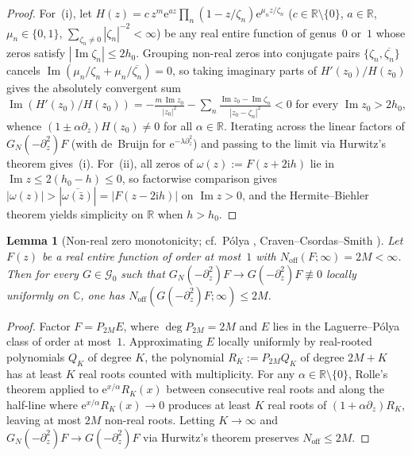 \documentclass[11pt,a4paper,reqno]{amsart}
\newtheorem{lemma}[theorem]{Lemma}
\theoremstyle{definition}
\theoremstyle{remark}
\numberwithin{equation}{section}
\newcommand{\R}{\mathbb{R}}
\newcommand{\C}{\mathbb{C}}
\newcommand{\ii}{\mathrm{i}}
\newcommand{\ee}{\mathrm{e}}
\DeclareMathOperator{\Imop}{Im}
\begin{document}
\begin{proof}
For~(i), let $H(z) = c\,z^m \ee^{a z}\prod_n (1 - z/\zeta_n)\ee^{\mu_n z/\zeta_n}$ ($c \in \R\setminus\{0\}$, $a \in \R$, $\mu_n \in \{0,1\}$, $\sum_{\zeta_n \ne 0} |\zeta_n|^{-2} < \infty$) be any real entire function of genus~$0$ or~$1$ whose zeros satisfy $|\Imop\zeta_n| \le 2h_0$. Grouping non-real zeros into conjugate pairs $\{\zeta_n, \overline{\zeta_n}\}$ cancels $\Imop(\mu_n/\zeta_n + \mu_n/\overline{\zeta_n}) = 0$, so taking imaginary parts of $H'(z_0)/H(z_0)$ gives the absolutely convergent sum $\Imop(H'(z_0)/H(z_0)) = -\frac{m\,\Imop z_0}{|z_0|^2} - \sum_n \frac{\Imop z_0 - \Imop\zeta_n}{|z_0 - \zeta_n|^2} < 0$ for every $\Imop z_0 > 2h_0$, whence $(1 \pm \alpha\partial_z)H(z_0) \ne 0$ for all $\alpha \in \R$. Iterating across the linear factors of $G_N(-\partial_z^2)F$ (with de~Bruijn \cite[Thm.~13]{debruijn1950} for $\ee^{-\lambda\partial_z^2}$) and passing to the limit via Hurwitz's theorem gives~(i). For~(ii), all zeros of $\omega(z) := F(z + 2\ii h)$ lie in $\Imop z \le 2(h_0 - h) \le 0$, so factorwise comparison gives $|\omega(z)| > |\overline{\omega(\bar{z})}| = |F(z - 2\ii h)|$ on $\Imop z > 0$, and the Hermite--Biehler theorem yields simplicity on $\R$ when $h > h_0$.
\end{proof}

\begin{lemma}[{Non-real zero monotonicity; cf.\ P\'olya \cite{polya1927}, Craven--Csordas--Smith \cite{cravencsordassmith1987}}]
\label{lem:nonreal-monotonicity}
Let $F(z)$ be a real entire function of order at most~$1$ with $N_{\mathrm{off}}(F; \infty) = 2M < \infty$. Then for every $G \in \mathcal{G}_0$ such that $G_N(-\partial_z^2)F \to G(-\partial_z^2)F \not\equiv 0$ locally uniformly on $\C$, one has $N_{\mathrm{off}}(G(-\partial_z^2)F; \infty) \le 2M$.
\end{lemma}

\begin{proof}
Factor $F = P_{2M}E$, where $\deg P_{2M} = 2M$ and $E$ lies in the Laguerre--P\'olya class of order at most~$1$. Approximating $E$ locally uniformly by real-rooted polynomials $Q_K$ of degree $K$, the polynomial $R_K := P_{2M}Q_K$ of degree $2M + K$ has at least $K$ real roots counted with multiplicity. For any $\alpha \in \R \setminus \{0\}$, Rolle's theorem applied to $\ee^{x/\alpha}R_K(x)$ between consecutive real roots and along the half-line where $\ee^{x/\alpha}R_K(x) \to 0$ produces at least $K$ real roots of $(1 + \alpha\partial_z)R_K$, leaving at most $2M$ non-real roots. Letting $K \to \infty$ and $G_N(-\partial_z^2)F \to G(-\partial_z^2)F$ via Hurwitz's theorem preserves $N_{\mathrm{off}} \le 2M$.
\end{proof}
\end{document}
